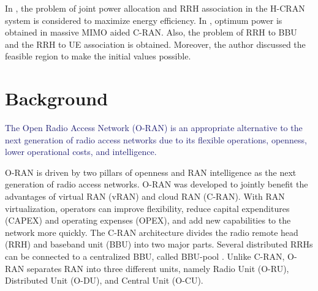 \documentclass[lettersize,journal]{IEEEtran}
\begin{document}
In \cite{ali2019energy,ali2019energy1,ali2018joint}, the problem of joint power allocation and RRH association in the H-CRAN system is considered to maximize energy efficiency.
In \cite{amani2019power}, optimum power is obtained in massive MIMO aided C-RAN. Also, the problem of RRH to BBU and the RRH to UE association is obtained. Moreover, the author discussed the feasible region to make the initial values possible.

\section{Background}\label{BG}
\textcolor{MidnightBlue}{The Open Radio Access Network (O-RAN) is an appropriate alternative to the next generation of radio access networks due to its flexible operations, openness, lower operational costs, and intelligence.}

O-RAN is driven by two pillars of openness and RAN intelligence as the next generation of radio access networks. O-RAN was developed to jointly benefit the advantages of virtual RAN (vRAN) and cloud RAN (C-RAN). With RAN virtualization, operators can improve flexibility, reduce capital expenditures (CAPEX) and operating expenses (OPEX), and add new capabilities to the network more quickly. The C-RAN architecture divides the radio remote head (RRH) and baseband unit (BBU) into two major parts. Several distributed RRHs can be connected to a centralized BBU, called BBU-pool \cite{han2019research}. Unlike C-RAN, O-RAN separates RAN into three different units, namely Radio Unit (O-RU), Distributed Unit (O-DU), and Central Unit (O-CU).
\end{document}
